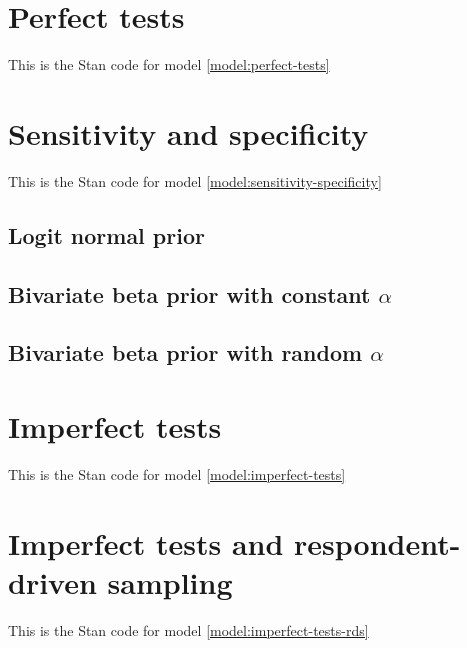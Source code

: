 \section{Perfect tests}

This is the Stan code for model \eqref{model:perfect-tests}



\section{Sensitivity and specificity}

This is the Stan code for model \eqref{model:sensitivity-specificity}

\subsection*{Logit normal prior}



\subsection*{Bivariate beta prior with constant $\alpha$}



\subsection*{Bivariate beta prior with random $\alpha$}



\section{Imperfect tests}

This is the Stan code for model \eqref{model:imperfect-tests}



\section{Imperfect tests and respondent-driven sampling}

This is the Stan code for model \eqref{model:imperfect-tests-rds}





